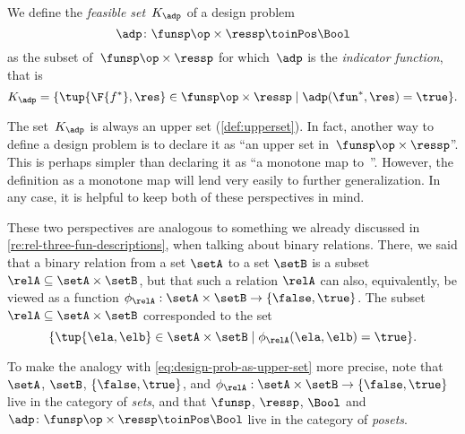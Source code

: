 \begin{definition}
  \label{def:dp-feasible-set}
  We define the \emph{feasible set}~$K_\adp$ of a design problem~
  \begin{equation}\label{eq:generic-design-prob}
\adp\colon \funsp\op \times \ressp\toinPos \Bool
\end{equation}
 as the subset of~$\funsp \op\times \ressp$ for which~$\adp$ is the \emph{indicator function}, that is%
  \begin{equation}\label{eq:design-prob-as-upper-set}
    K_\adp = \{ \tup{\F{f^*},\res} \in \funsp \op\times \ressp  \mid %
    \adp(\fun^*, \res) = \true %
    \}.
  \end{equation}
\end{definition}

  The set~$K_\adp$ is always an upper set (\cref{def:upperset}).
  In fact, another way to define a design problem is to declare it as ``an upper set in~$\funsp\op \times \ressp$''. This is perhaps simpler than declaring it as ``a monotone map to~\Bool''. However, the definition as a monotone map will lend very easily to further generalization. In any case, it is helpful to keep both of these perspectives in mind. 

These two perspectives are analogous to something we already discussed in \cref{re:rel-three-fun-descriptions}, when talking about binary relations. There, we said that a binary relation from a set $\setA$ to a set $\setB$ is a subset $\relA \subseteq \setA \times \setB$, but that such a relation $\relA$ can also, equivalently, be viewed as a function $\phi_{\relA}: \setA \times \setB \to \{ \false, \true \}$. The subset $\relA \subseteq \setA \times \setB$ corresponded to the set
\begin{equation}
\{ \tup{\ela, \elb} \in \setA \times \setB \mid \phi_{\relA}(\ela, \elb) = \true \}.
\end{equation}

To make the analogy with \cref{eq:design-prob-as-upper-set} more precise, note that $\setA$, $\setB$, $\{ \false, \true \}$, and $\phi_{\relA}: \setA \times \setB \to \{ \false, \true \}$ live in the category of \emph{sets}, and that $\funsp$,  $\ressp$, $\Bool$ and $\adp\colon \funsp\op \times \ressp\toinPos \Bool$ live in the category of \emph{posets}. 

